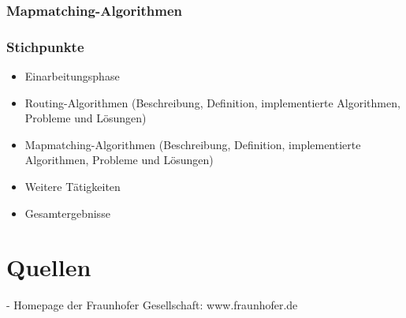 \documentclass[twoside, a4paper]{scrartcl}
\begin{document}
\subsubsection{Mapmatching-Algorithmen}
\label{sec:mapm-algor}



\newpage
\subsubsection{Stichpunkte}
\label{sec:stichpunkte-1}

\begin{itemize}
\item Einarbeitungsphase
\item Routing-Algorithmen (Beschreibung, Definition, implementierte Algorithmen, Probleme und Lösungen)
\item Mapmatching-Algorithmen (Beschreibung, Definition, implementierte Algorithmen, Probleme und Lösungen)
\item Weitere Tätigkeiten
\item Gesamtergebnisse
\end{itemize}









\section{Quellen}
\label{sec:quellen}

- Homepage der Fraunhofer Gesellschaft: www.fraunhofer.de
\end{document}

